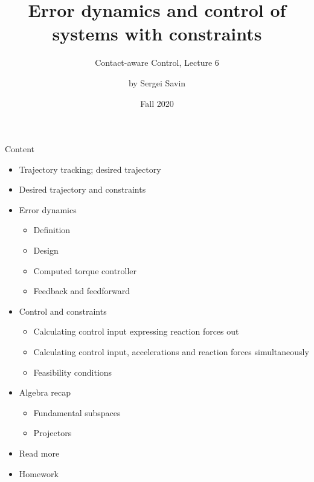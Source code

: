 \documentclass{beamer}
\title{Error dynamics and control of systems with constraints}
\subtitle{Contact-aware Control, Lecture 6}
\author{by Sergei Savin}
\date{Fall 2020}
\begin{document}
\maketitle


\begin{frame}{Content}

\begin{itemize}
\item Trajectory tracking; desired trajectory
\item Desired trajectory and constraints
\item Error dynamics
\begin{itemize}
\item Definition
\item Design
\item Computed torque controller
\item Feedback and feedforward
\end{itemize}
\item Control and constraints
\begin{itemize}
\item Calculating control input expressing reaction forces out
\item Calculating control input, accelerations and reaction forces simultaneously
\item Feasibility conditions
\end{itemize}
\item Algebra recap
\begin{itemize}
\item Fundamental subspaces
\item Projectors
\end{itemize}
\item Read more
\item Homework
\end{itemize}

\end{frame}
\end{document}

